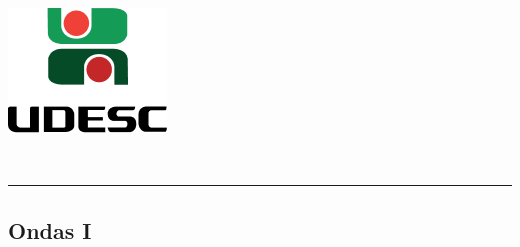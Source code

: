 \thispagestyle{empty}
\begin{center}
	\begin{minipage}[!]{\linewidth}
        \begin{minipage}[!]{.19\linewidth}
            \includegraphics[width=\linewidth]{img/logo.png}           
        \end{minipage}
        \begin{minipage}[!]{.8\linewidth}
            \center
            \ABNTEXchapterfont\normalsize\MakeUppercase{\imprimirinstituicao}
            \par
            \vspace*{10pt}                     
            \ABNTEXchapterfont\normalsize\MakeUppercase{\centro}
            \par
            \vspace*{10pt}           
            \ABNTEXchapterfont\normalsize\MakeUppercase{\disciplina}
        \end{minipage}        
    \end{minipage}
    \\ \vspace{0.5cm}
    \rule{\textwidth}{.5pt}   
\end{center}
    \textual
    \begin{center}
      \section{Ondas I}
      \par
    \end{center}
    
